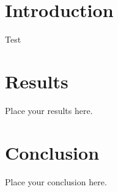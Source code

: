 \documentclass[UKenglish,texlive=2013]{\ATLASLATEXPATH atlasdoc}
\begin{document}
\maketitle

\tableofcontents


\section{Introduction}
\label{sec:intro}
Test~\cite{bib:Crogan}



\section{Results}
\label{sec:result}
Place your results here.



\section{Conclusion}
\label{sec:conclusion}

Place your conclusion here.




\end{document}
